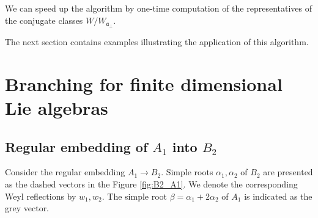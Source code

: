 \documentclass[12pt]{iopart}
\theoremstyle{definition}
\newcommand{\afb}{\mathfrak{a}_{\bot}}
\begin{document}
We can speed up the algorithm by
one-time computation of the representatives of the conjugate classes $%
W/W_{\afb }$.

The next section contains examples illustrating the application of this
algorithm.

\section{Branching for finite dimensional Lie algebras}
\label{sec:finite-dimens-lie}

\subsection{Regular embedding of $A_1$ into $B_2$}
\label{sec:regul-embedd-a_1}

Consider the regular embedding $A_1\to B_2$. Simple roots $\alpha_1, \alpha_2$ of $B_2$ are presented as the dashed vectors in the Figure \ref{fig:B2_A1}. We denote the corresponding Weyl reflections by $w_1, w_2$. The simple root $\beta = \alpha_1+2\alpha_2$ of $A_1$ is indicated as the grey vector.
\end{document}
